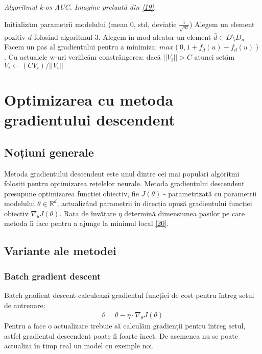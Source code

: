 \begin{algorithm}[!h]
\caption[Algoritmul k-os AUC]{\textit{Algoritmul k-os AUC. Imagine preluată din \hyperlink{jasonkos}{[19]}.}}
\begin{algorithmic}[!h]
    \State Inițializăm parametrii modelului (mean 0, std, deviație $\frac{1}{\sqrt{m}}$)
    \Repeat
    \State Alegem un element pozitiv $d$ folosind algoritmul 3.
    \State Alegem în mod aleator un element $\bar{d} \in D \setminus D_u$
        \State Facem un pas al gradientului pentru a minimiza:
        \State $max(0, 1 + f_{\bar{d}}(u) - f_d(u))$.
        \State Cu actualele w-uri verificăm constrângerea: dacă $|| V_i || > C$ atunci setăm $V_i \leftarrow (CV_i)/||V_i||$
    \EndIf
\EndProcedure
\end{algorithmic}
\end{algorithm}

\section{Optimizarea cu metoda gradientului descendent}
\subsection{Noțiuni generale}
Metoda gradientului descendent este unul dintre cei mai populari algoritmi folosiți pentru optimizarea rețelelor neurale. Metoda gradientului descendent presupune optimizarea funcției obiectiv, fie $J(\theta)$ - parametrizată cu parametrii modelului $\theta \in \mathbb{R}^d$, actualizând parametrii în direcția opusă gradientului funcției obiectiv $\nabla_{\theta}J(\theta)$. Rata de învățare $\eta$ determină dimensiunea pașilor pe care metoda îi face pentru a ajunge la minimul local \hyperlink{ruder2016}{[20]}.

\subsection{Variante ale metodei}
\subsubsection{Batch gradient descent}
Batch gradient descent calculează gradientul funcției de cost pentru întreg setul de antrenare:
\begin{align}
	\theta = \theta - \eta \cdot \nabla_{\theta}J(\theta)
\end{align}
Pentru a face o actualizare trebuie să calculăm gradienții pentru întreg setul, astfel gradientul descendent poate fi foarte încet. De asemenea nu se poate actualiza în timp real un model cu exemple noi.


